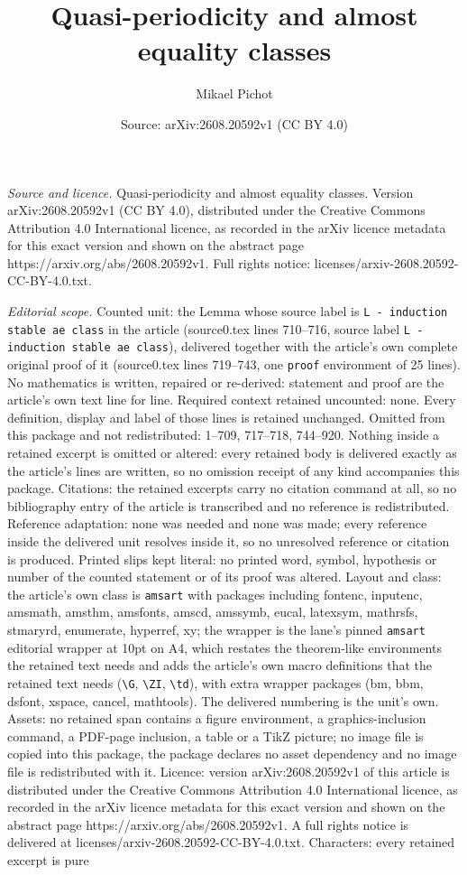 \documentclass[10pt,a4paper]{amsart}
\title[Quasi-periodicity and almost equality classes]{Quasi-periodicity and almost equality classes}
\author{Mikael Pichot}
\date{Source: arXiv:2608.20592v1 (CC BY 4.0)}
\begin{document}
\maketitle

\noindent\emph{Source and licence.} Quasi-periodicity and almost equality classes. Version arXiv:2608.20592v1 (CC BY 4.0), distributed under the Creative Commons Attribution 4.0 International licence, as recorded in the arXiv licence metadata for this exact version and shown on the abstract page https://arxiv.org/abs/2608.20592v1. Full rights notice: licenses/arxiv-2608.20592-CC-BY-4.0.txt.\par\smallskip

\noindent\textit{Editorial scope.} Counted unit: the Lemma whose source label is \texttt{L - induction stable ae class} in the article (source0.tex lines 710--716, source label \texttt{L - induction stable ae class}), delivered together with the article's own complete original proof of it (source0.tex lines 719--743, one \texttt{proof} environment of 25 lines). No mathematics is written, repaired or re-derived: statement and proof are the article's own text line for line. Required context retained uncounted: none. Every definition, display and label of those lines is retained unchanged. Omitted from this package and not redistributed: 1--709, 717--718, 744--920. Nothing inside a retained excerpt is omitted or altered: every retained body is delivered exactly as the article's lines are written, so no omission receipt of any kind accompanies this package. Citations: the retained excerpts carry no citation command at all, so no bibliography entry of the article is transcribed and no reference is redistributed. Reference adaptation: none was needed and none was made; every reference inside the delivered unit resolves inside it, so no unresolved reference or citation is produced. Printed slips kept literal: no printed word, symbol, hypothesis or number of the counted statement or of its proof was altered. Layout and class: the article's own class is \texttt{amsart} with packages including fontenc, inputenc, amsmath, amsthm, amsfonts, amscd, amssymb, eucal, latexsym, mathrsfs, stmaryrd, enumerate, hyperref, xy; the wrapper is the lane's pinned \texttt{amsart} editorial wrapper at 10pt on A4, which restates the theorem-like environments the retained text needs and adds the article's own macro definitions that the retained text needs (\texttt{\textbackslash G}, \texttt{\textbackslash ZI}, \texttt{\textbackslash td}), with extra wrapper packages (bm, bbm, dsfont, xspace, cancel, mathtools). The delivered numbering is the unit's own. Assets: no retained span contains a figure environment, a graphics-inclusion command, a PDF-page inclusion, a table or a TikZ picture; no image file is copied into this package, the package declares no asset dependency and no image file is redistributed with it. Licence: version arXiv:2608.20592v1 of this article is distributed under the Creative Commons Attribution 4.0 International licence, as recorded in the arXiv licence metadata for this exact version and shown on the abstract page https://arxiv.org/abs/2608.20592v1. A full rights notice is delivered at licenses/arxiv-2608.20592-CC-BY-4.0.txt. Characters: every retained excerpt is pure 
\end{document}
